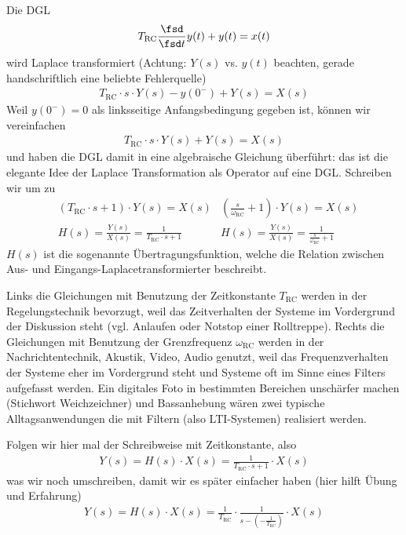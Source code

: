 \begin{ExCalc}
Die DGL
\begin{align}
T_\mathrm{RC}\frac{\fsd}{\fsd t} y(t) + y(t) = x(t)\\
\end{align}
wird Laplace transformiert (Achtung: $Y(s)$ vs. $y(t)$ beachten,
gerade handschriftlich eine beliebte Fehlerquelle)
\begin{align}
T_\mathrm{RC} \cdot s \cdot Y(s) - y(0^-) + Y(s) = X(s)
\end{align}
Weil $y(0^-)=0$ als linksseitige Anfangsbedingung gegeben ist, können wir vereinfachen
\begin{align}
T_\mathrm{RC} \cdot s \cdot Y(s) + Y(s) = X(s)
\end{align}
und haben die DGL damit in eine algebraische Gleichung überführt: das ist die
elegante Idee der Laplace Transformation als Operator auf eine DGL.
%
Schreiben wir um zu
\begin{align}
&(T_\mathrm{RC} \cdot s + 1 ) \cdot Y(s) = X(s)
& (\frac{s}{\omega_\mathrm{RC}} + 1 ) \cdot Y(s) = X(s) \\
&H(s) = \frac{Y(s)}{X(s)} = \frac{1}{T_\mathrm{RC} \cdot s + 1}
&H(s) = \frac{Y(s)}{X(s)} = \frac{1}{\frac{s}{\omega_\mathrm{RC}} + 1}
\end{align}
%
$H(s)$ ist die sogenannte Übertragungsfunktion, welche
die Relation zwischen Aus- und Eingangs-Laplacetransformierter beschreibt.

Links die Gleichungen mit Benutzung der Zeitkonstante $T_\mathrm{RC}$ werden in der
Regelungstechnik bevorzugt, weil das Zeitverhalten der Systeme im Vordergrund
der Diskussion steht (vgl. Anlaufen oder Notstop einer Rolltreppe).
%
Rechts die Gleichungen mit Benutzung der Grenzfrequenz $\omega_\mathrm{RC}$ werden
in der Nachrichtentechnik, Akustik, Video, Audio genutzt, weil das Frequenzverhalten
der Systeme eher im Vordergrund steht und Systeme oft im Sinne eines Filters
aufgefasst werden. Ein digitales Foto in bestimmten Bereichen unschärfer machen
(Stichwort Weichzeichner) und
Bassanhebung wären zwei typische Alltagsanwendungen die mit Filtern
(also LTI-Systemen) realisiert werden.

Folgen wir hier mal der Schreibweise mit Zeitkonstante, also
\begin{align}
Y(s) = H(s) \cdot X(s) = \frac{1}{T_\mathrm{RC} \cdot s + 1} \cdot X(s)
\end{align}
was wir noch umschreiben, damit wir es später einfacher haben (hier hilft Übung und Erfahrung)
\begin{align}
Y(s) = H(s) \cdot X(s) = \frac{1}{T_\mathrm{RC}} \cdot \frac{1}{s - (-\frac{1}{T_\mathrm{RC}})} \cdot X(s)
\end{align}


\end{ExCalc}
